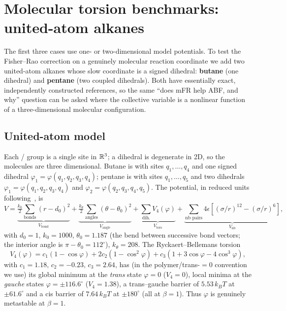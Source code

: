 \section{Molecular torsion benchmarks: united-atom alkanes}
\label{sec:alkane_model}

The first three cases use one- or two-dimensional model potentials. To test the
Fisher--Rao correction on a genuinely molecular reaction coordinate we add two
united-atom alkanes whose slow coordinate is a signed dihedral: \textbf{butane}
(one dihedral) and \textbf{pentane} (two coupled dihedrals). Both have essentially
exact, independently constructed references, so the same ``does mFR help ABF, and
why'' question can be asked where the collective variable is a nonlinear function of
a three-dimensional molecular configuration.

\subsection{United-atom model}
Each / group is a single site in $\mathbb{R}^3$; a dihedral is degenerate in
2D, so the molecules are three dimensional. Butane is  with
sites $q_1,\dots,q_4$ and one signed dihedral $\varphi_1=\varphi(q_1,q_2,q_3,q_4)$;
pentane is  with sites $q_1,\dots,q_5$ and two dihedrals
$\varphi_1=\varphi(q_1,q_2,q_3,q_4)$ and $\varphi_2=\varphi(q_2,q_3,q_4,q_5)$. The
potential, in reduced units following~\citep{CancesLegollStoltz2007,LelievreRoussetStoltz2010},
is
\begin{equation}
  V = \underbrace{\tfrac{k_0}{2}\!\sum_{\text{bonds}}\!(r-d_0)^2}_{V_{\text{bond}}}
    + \underbrace{\tfrac{k_\theta}{2}\!\sum_{\text{angles}}\!(\theta-\theta_0)^2}_{V_{\text{angle}}}
    + \underbrace{\sum_{\text{dih.}} V_4(\varphi)}_{V_{\text{tors}}}
    + \underbrace{\sum_{\text{nb pairs}}\! 4\epsilon\!\left[(\sigma/r)^{12}\!-\!(\sigma/r)^{6}\right]}_{V_{\text{nb}}},
  \label{eq:alkane_V}
\end{equation}
with $d_0=1$, $k_0=1000$, $\theta_0=1.187$ (the bend between successive bond
vectors; the interior  angle is $\pi-\theta_0=112^\circ$), $k_\theta=208$.
The Ryckaert--Bellemans torsion~\citep{RyckaertBellemans1975}
\begin{equation}
  V_4(\varphi)=c_1(1-\cos\varphi)+2c_2(1-\cos^2\varphi)+c_3(1+3\cos\varphi-4\cos^3\varphi),
  \label{eq:rb}
\end{equation}
with $c_1=1.18,\,c_2=-0.23,\,c_3=2.64$, has (in the polymer/trans-$=0$ convention we
use) its global minimum at the \emph{trans} state $\varphi=0$ ($V_4=0$), local
minima at the \emph{gauche} states $\varphi=\pm116.6^\circ$ ($V_4=1.38$), a
trans--gauche barrier of $5.53\,k_BT$ at $\pm61.6^\circ$ and a cis barrier of
$7.64\,k_BT$ at $\pm180^\circ$ (all at $\beta=1$). Thus $\varphi$ is genuinely
metastable at $\beta=1$.


